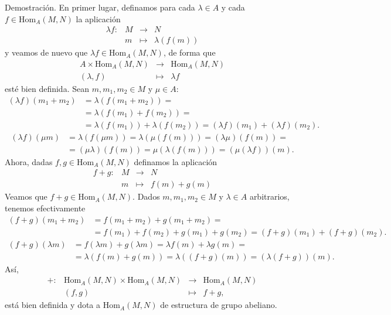 \documentclass[a4paper,12pt]{article}
\newcommand{\Hom}{\text{Hom}}
\begin{document}
Demostración. En primer lugar, definamos para cada $\lambda\in A$ y cada $f\in\Hom_A(M,N)$ la aplicación
$$\begin{array}{rccl}
    \lambda f:&M&\longrightarrow&N\\
    &m&\longmapsto&\lambda(f(m))
\end{array}$$
y veamos de nuevo que $\lambda f\in\Hom_A(M,N)$, de forma que
$$\begin{array}{rcl}
    A\times\Hom_A(M,N)&\longrightarrow&\Hom_A(M,N)\\
    (\lambda,f)&\longmapsto&\lambda f
\end{array}$$
esté bien definida. Sean $m,m_1,m_2\in M$ y $\mu\in A$:
\begin{align*}
    (\lambda f)(m_1+m_2)&=\lambda(f(m_1+m_2))=\\
    &=\lambda(f(m_1)+f(m_2))=\\
    &=\lambda(f(m_1))+\lambda(f(m_2))=(\lambda f)(m_1)+(\lambda f)(m_2).
\end{align*}
\begin{align*}
    (\lambda f)(\mu m)&=\lambda(f(\mu m))=\lambda(\mu(f(m)))=(\lambda\mu)(f(m))=\\
    &=(\mu\lambda)(f(m))=\mu(\lambda(f(m)))=(\mu(\lambda f))(m).
\end{align*}
Ahora, dadas $f,g\in\Hom_A(M,N)$ definamos la aplicación
$$\begin{array}{rccl}
    f+g:&M&\longrightarrow&N\\
    &m&\longmapsto&f(m)+g(m)
\end{array}$$
Veamos que $f+g\in\Hom_A(M,N)$. Dados $m,m_1,m_2\in M$ y $\lambda\in A$ arbitrarios, tenemos efectivamente
\begin{align*}
    (f+g)(m_1+m_2)&=f(m_1+m_2)+g(m_1+m_2)=\\
    &=f(m_1)+f(m_2)+g(m_1)+g(m_2)=(f+g)(m_1)+(f+g)(m_2).
\end{align*}
\begin{align*}
    (f+g)(\lambda m)&=f(\lambda m)+g(\lambda m)=\lambda f(m)+\lambda g(m)=\\
    &=\lambda(f(m)+g(m))=\lambda((f+g)(m))=(\lambda(f+g))(m).
\end{align*}
Así,
$$\begin{array}{rrcl}
    +:&\Hom_A(M,N)\times\Hom_A(M,N)&\longrightarrow&\Hom_A(M,N)\\
    &(f,g)&\longmapsto&f+g,
\end{array}$$
está bien definida y dota a $\Hom_A(M,N)$ de estructura de grupo abeliano.
\end{document}
